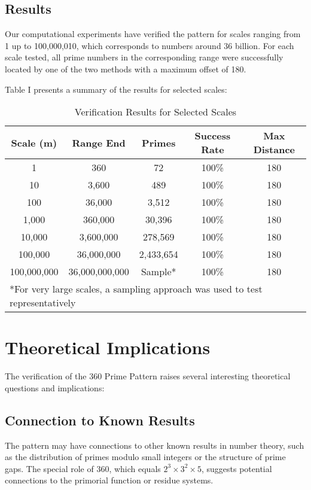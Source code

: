 \documentclass[conference]{IEEEtran}
\begin{document}
\subsection{Results}
Our computational experiments have verified the pattern for scales ranging from 1 up to 100,000,010, which corresponds to numbers around 36 billion. For each scale tested, all prime numbers in the corresponding range were successfully located by one of the two methods with a maximum offset of 180.

Table I presents a summary of the results for selected scales:

\begin{table}[h]
\caption{Verification Results for Selected Scales}
\begin{center}
\begin{tabular}{|c|c|c|c|c|}
\hline
\textbf{Scale (m)} & \textbf{Range End} & \textbf{Primes} & \textbf{Success Rate} & \textbf{Max Distance} \\
\hline
1 & 360 & 72 & 100\% & 180 \\
\hline
10 & 3,600 & 489 & 100\% & 180 \\
\hline
100 & 36,000 & 3,512 & 100\% & 180 \\
\hline
1,000 & 360,000 & 30,396 & 100\% & 180 \\
\hline
10,000 & 3,600,000 & 278,569 & 100\% & 180 \\
\hline
100,000 & 36,000,000 & 2,433,654 & 100\% & 180 \\
\hline
100,000,000 & 36,000,000,000 & Sample* & 100\% & 180 \\
\hline
\multicolumn{5}{|l|}{*For very large scales, a sampling approach was used to test representatively} \\
\hline
\end{tabular}
\end{center}
\end{table}

\section{Theoretical Implications}
The verification of the 360 Prime Pattern raises several interesting theoretical questions and implications:

\subsection{Connection to Known Results}
The pattern may have connections to other known results in number theory, such as the distribution of primes modulo small integers or the structure of prime gaps. The special role of 360, which equals $2^3 \times 3^2 \times 5$, suggests potential connections to the primorial function or residue systems.
\end{document}
